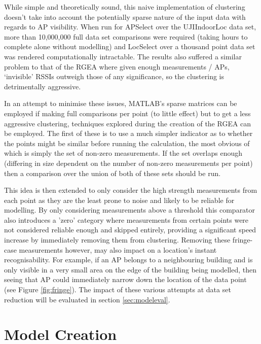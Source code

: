 \documentclass{UoYCSproject}
\begin{document}
	        While simple and theoretically sound, this naive implementation of clustering doesn't take into account the potentially sparse nature of the input data with regards to AP visibility. When run for APSelect over the UJIIndoorLoc data set, more than 10,000,000 full data set comparisons were required (taking hours to complete alone without modelling) and LocSelect over a thousand point data set was rendered computationally intractable. The results also suffered a similar problem to that of the RGEA where given enough measurements / APs, `invisible' RSSIs outweigh those of any significance, so the clustering is detrimentally aggressive.
	        
	        In an attempt to minimise these issues, MATLAB's sparse matrices can be employed if making full comparisons per point (to little effect) but to get a less aggressive clustering, techniques explored during the creation of the RGEA can be employed. The first of these is to use a much simpler indicator as to whether the points might be similar before running the calculation, the most obvious of which is simply the set of non-zero measurements. If the set overlaps enough (differing in size dependent on the number of non-zero measurements per point) then a comparison over the union of both of these sets should be run.
	        
	        This idea is then extended to only consider the high strength measurements from each point as they are the least prone to noise and likely to be reliable for modelling. By only considering measurements above a threshold this comparator also introduces a 'zero' category where measurements from certain points were not considered reliable enough and skipped entirely, providing a significant speed increase by immediately removing them from clustering. Removing these fringe-case measurements however, may also impact on a location's instant recognisability. For example, if an AP belongs to a neighbouring building and is only visible in a very small area on the edge of the building being modelled, then seeing that AP could immediately narrow down the location of the data point (see Figure \ref{fig:fringe}). The impact of these various attempts at data set reduction will be evaluated in section \ref{sec:modeleval}.
		
		\section{Model Creation}
        \label{sec:modelcreation}
        
\end{document}

